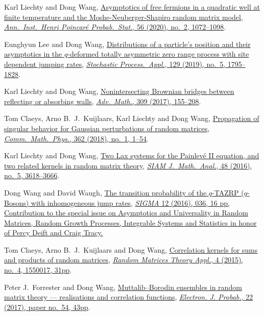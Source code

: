\begin{etaremune}
\item
  Karl Liechty and Dong Wang, \href{https://arxiv.org/abs/1706.06653}{Asymptotics of free fermions in a quadratic well at finite temperature and the Moshe-Neuberger-Shapiro random matrix model}, \href{https://doi.org/10.1214/19-AIHP994}{\textit{Ann.\ Inst.\ Henri Poincar\'{e} Probab.\ Stat.}, 56 (2020), no.\ 2, 1072--1098}.
\item
  Eunghyun Lee and Dong Wang, \href{https://arxiv.org/abs/1703.08839}{Distributions of a particle's position and their asymptotics in the $q$-deformed totally asymmetric zero range process with site dependent jumping rates}, \href{https://doi.org/10.1016/j.spa.2018.06.005}{\textit{Stochastic Process.\ Appl.}, 129 (2019), no.\ 5, 1795--1828}.
\item
  Karl Liechty and Dong Wang, \href{http://arxiv.org/abs/1608.08712}{Nonintersecting Brownian bridges between reflecting or absorbing walls}, \href{https://doi.org/10.1016/j.aim.2016.10.024}{\textit{Adv.\ Math.}, 309 (2017), 155--208}.
\item
  Tom Claeys, Arno B.~J.~Kuijlaars, Karl Liechty and Dong Wang, \href{http://arxiv.org/abs/1608.05870}{Propagation of singular behavior for Gaussian perturbations of random matrices}, \href{https://doi.org/10.1007/s00220-018-3195-8}{\textit{Comm.\ Math.\ Phys.}, 362 (2018), no.\ 1, 1--54}.
\item
  Karl Liechty and Dong Wang, \href{http://arxiv.org/abs/1601.01603}{Two Lax systems for the Painlev\'{e} II equation, and two related kernels in random matrix theory}, \href{https://doi.org/10.1137/16M1056080}{\textit{SIAM J.\ Math.\ Anal.}, 48 (2016), no.\ 5, 3618--3666}.
\item
  Dong Wang and David Waugh, \href{http://arxiv.org/abs/1512.01612}{The transition probability of the $q$-TAZRP ($q$-Bosons) with inhomogeneous jump rates}, \href{https://doi.org/10.3842/SIGMA.2016.037}{\textit{SIGMA} 12 (2016), 036, 16 pp, Contribution to the special issue on Asymptotics and Universality in Random Matrices, Random Growth Processes, Integrable Systems and Statistics in honor of Percy Deift and Craig Tracy.}
\item 
  Tom Claeys, Arno B.~J.~Kuijlaars and Dong Wang, \href{http://arxiv.org/abs/1505.00610}{Correlation kernels for sums and products of random matrices}, \href{https://doi.org/10.1142/S2010326315500173}{\textit{Random Matrices Theory Appl.}, 4 (2015), no.\ 4, 1550017, 31pp}.
\item
  Peter J.~Forrester and Dong Wang, \href{http://arxiv.org/abs/1502.07147}{Muttalib--Borodin ensembles in random matrix theory --- realisations and correlation functions}, \href{https://doi.org/10.1214/17-EJP62}{\textit{Electron. J. Probab.}, 22 (2017), paper no.\ 54, 43pp}.

\end{etaremune}
